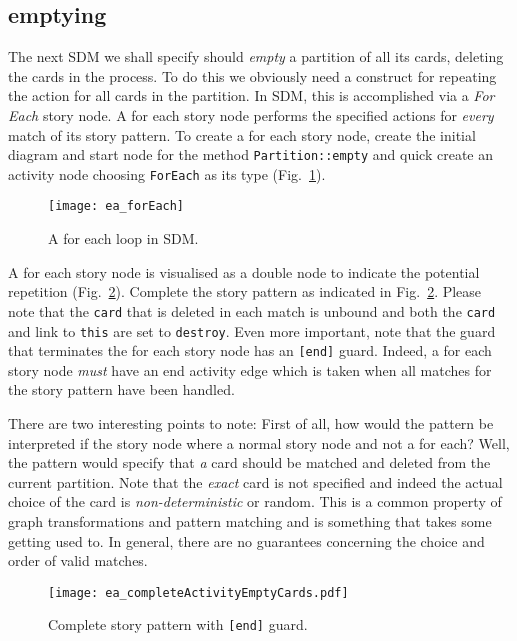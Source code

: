 \subsection{emptying}

The next SDM we shall specify should \emph{empty} a partition of all its cards, deleting the cards in the process. To do this we obviously need a construct for
repeating the action for all cards in the partition. In SDM, this is  accomplished via a \emph{For Each} story node. A for each story node
performs the specified actions for \emph{every} match of its story pattern. To create a for each story node, create the initial diagram and start node for the
method \texttt{Partition::empty} and quick create an activity node choosing \texttt{ForEach} as its type (Fig.~\ref{fig:sdm_foreach}).

\begin{figure}[htbp]
\begin{center}
  \texttt{[image: ea\_forEach]}
  \caption{A for each loop in SDM.}  
  \label{fig:sdm_foreach}
\end{center}
\end{figure}

A for each story node is visualised as a double node to indicate the potential repetition (Fig.~\ref{fig:sdm_end}).  Complete the story pattern as indicated in
Fig.~\ref{fig:sdm_end}.   Please note that the \texttt{card} that is deleted in each match is unbound and both the \texttt{card} and link to \texttt{this} are
set to \texttt{destroy}. Even more important, note that the guard that terminates the for each story node has an \texttt{[end]} guard. Indeed, a for each story
node \emph{must} have an end activity edge which is taken when all matches for the story pattern have been handled.

There are two interesting points to note: First of all, how would the pattern be interpreted if the story node where a normal story node and not a for each?
   Well, the pattern would specify that \emph{a} card should be matched and deleted from the current partition. Note that the \emph{exact}
card is not specified and indeed the actual choice of the card is \emph{non-deterministic} or random.  This is a common property of graph transformations and
pattern matching and is something that takes some getting used to.  In general, there are no guarantees concerning the choice and order of valid matches.

\begin{figure}[htbp]
\begin{center}
  \texttt{[image: ea\_completeActivityEmptyCards.pdf]}
  \caption{Complete story pattern with \texttt{[end]} guard.}  
  \label{fig:sdm_end}
\end{center}
\end{figure}

